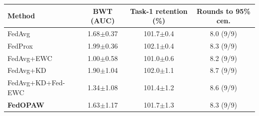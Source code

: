 \begin{tabular}{@{}lccc@{}}
\toprule
Method & BWT (AUC) & Task-1 retention (\%) & Rounds to 95\% cen. \\
\midrule
FedAvg & 1.68$\pm$0.37 & 101.7$\pm$0.4 & 8.0 (9/9) \\
FedProx & 1.99$\pm$0.36 & 102.1$\pm$0.4 & 8.3 (9/9) \\
FedAvg+EWC & 1.00$\pm$0.58 & 101.0$\pm$0.6 & 8.2 (9/9) \\
FedAvg+KD & 1.90$\pm$1.04 & 102.0$\pm$1.1 & 8.7 (9/9) \\
FedAvg+KD+Fed-EWC & 1.34$\pm$1.08 & 101.4$\pm$1.2 & 8.6 (9/9) \\
\textbf{FedOPAW} & 1.63$\pm$1.17 & 101.7$\pm$1.3 & 8.3 (9/9) \\
\bottomrule
\end{tabular}
